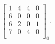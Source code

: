 \begin{equation}\label{eqn:surface8iso}
\left[
\begin{array}{*{4}{r}}
1 &4 &4 &0\\ 
6 &0 &0 &0 \\
6 &2 &0 &1 \\
7 &0 &4 &0 \\
\end{array}
\right]
_0.
\end{equation}
